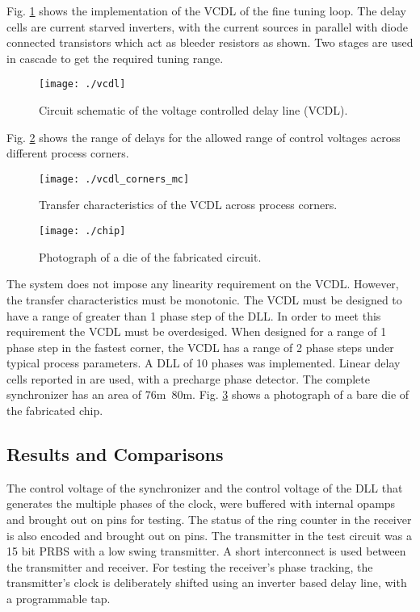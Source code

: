 \documentclass[journal,twoside,letterpaper]{IEEEtran}
\begin{document}
Fig. \ref{fig:vcdl} shows the implementation of the VCDL
of the fine tuning loop. The delay cells are current starved inverters,
with the current sources in parallel with diode connected transistors which
act as bleeder resistors as shown. Two stages are used in cascade to get the
required tuning range. 
\begin{figure}[h!]
\centering
\texttt{[image: ./vcdl]}
\caption{Circuit schematic of the voltage controlled delay line (VCDL).}
\label{fig:vcdl}
\end{figure}
Fig. \ref{fig:vcdl_range} shows the range of delays for the allowed
range of control voltages across different process corners.
\begin{figure}[h!]
\centering
{}
\texttt{[image: ./vcdl\_corners\_mc]}
\caption{Transfer characteristics of the VCDL across process corners.}
\label{fig:vcdl_range}
\end{figure}
\begin{figure}[h]
\centering
{}
\texttt{[image: ./chip]}
\caption{Photograph of a die of the fabricated circuit.}
\label{fig:chip}
\end{figure}
The system does not impose any linearity requirement on the VCDL. However,
the transfer characteristics must be monotonic. The VCDL must be designed 
to have a range of greater than 1 phase step of the DLL.
In order to meet this requirement the VCDL must be overdesiged. 
When designed for a range of 1 phase step in the fastest corner,
the VCDL has a range of 2 phase steps under typical process parameters.
A DLL of 10 phases was implemented. Linear delay cells
reported in \cite{delay_cell_2008} are used, with a precharge phase 
detector. The complete synchronizer has an area of 
\mbox{76m  80m}. 
Fig. \ref{fig:chip} shows a photograph of
a bare die of the fabricated chip.

\subsection{Results and Comparisons}
The control voltage  of the synchronizer and the
control voltage of the DLL that generates the multiple phases of the clock,
were buffered with internal opamps and brought out on pins for
testing. The status of the ring counter in the receiver is
also encoded and brought out on pins. The transmitter in the
test circuit was a 15 bit PRBS with a low swing transmitter.
A short interconnect is used between the transmitter and receiver. For
testing the receiver's phase tracking, the transmitter's clock 
is deliberately shifted using an
inverter based delay line, with a programmable tap.
\end{document}
